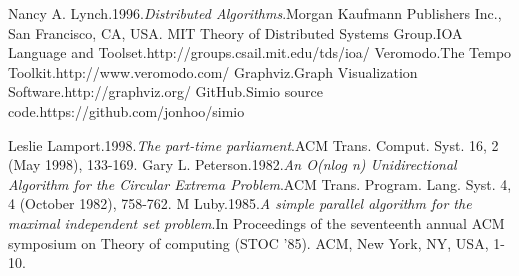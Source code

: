 \documentclass{scrartcl}
\begin{document}
\begin{thebibliography}{1}
 Nancy A. Lynch.\@ 1996.\@ {\em Distributed Algorithms}.\@ Morgan Kaufmann Publishers Inc., San Francisco, CA, USA. 
 MIT Theory of Distributed Systems Group.\@ IOA Language and Toolset.\@ http://groups.csail.mit.edu/tds/ioa/
 Veromodo.\@ The Tempo Toolkit.\@ http://www.veromodo.com/
 Graphviz.\@ Graph Visualization Software.\@ http://graphviz.org/
 GitHub.\@ Simio source code.\@ https://github.com/jonhoo/simio

 Leslie Lamport.\@ 1998.\@ {\em The part-time parliament}.\@ ACM Trans.  Comput. Syst. 16, 2 (May 1998), 133-169.
 Gary L. Peterson.\@ 1982.\@ {\em An O(nlog n) Unidirectional Algorithm for the Circular Extrema Problem}.\@ ACM Trans. Program. Lang.  Syst. 4, 4 (October 1982), 758-762.
 M Luby.\@ 1985.\@ {\em A simple parallel algorithm for the maximal independent set problem}.\@ In Proceedings of the seventeenth annual ACM symposium on Theory of computing (STOC '85). ACM, New York, NY, USA, 1-10.
\end{thebibliography}
\end{document}
